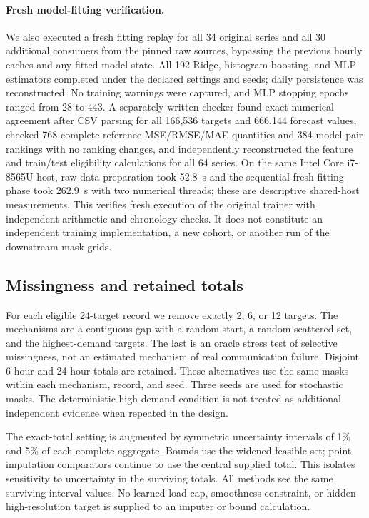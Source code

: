 \documentclass[12pt]{article}
\begin{document}
\paragraph{Fresh model-fitting verification.}
We also executed a fresh fitting replay for all 34 original series and all 30 additional consumers from the pinned raw sources, bypassing the previous hourly caches and any fitted model state. All 192 Ridge, histogram-boosting, and MLP estimators completed under the declared settings and seeds; daily persistence was reconstructed. No training warnings were captured, and MLP stopping epochs ranged from 28 to 443. A separately written checker found exact numerical agreement after CSV parsing for all 166,536 targets and 666,144 forecast values, checked 768 complete-reference MSE/RMSE/MAE quantities and 384 model-pair rankings with no ranking changes, and independently reconstructed the feature and train/test eligibility calculations for all 64 series. On the same Intel Core i7-8565U host, raw-data preparation took 52.8~s and the sequential fresh fitting phase took 262.9~s with two numerical threads; these are descriptive shared-host measurements. This verifies fresh execution of the original trainer with independent arithmetic and chronology checks. It does not constitute an independent training implementation, a new cohort, or another run of the downstream mask grids.

\subsection{Missingness and retained totals}
For each eligible 24-target record we remove exactly 2, 6, or 12 targets.
The mechanisms are a contiguous gap with a random start, a random scattered
set, and the highest-demand targets. The last is an oracle stress test of
selective missingness, not an estimated mechanism of real communication
failure. Disjoint 6-hour and 24-hour totals are retained. These alternatives
use the same masks within each mechanism, record, and seed. Three seeds
are used for stochastic masks. The deterministic high-demand condition is
not treated as additional independent evidence when repeated in the design.

The exact-total setting is augmented by symmetric uncertainty intervals of
1\% and 5\% of each complete aggregate. Bounds use the widened feasible
set; point-imputation comparators continue to use the central supplied
total. This isolates sensitivity to uncertainty in the surviving totals.
All methods see the same surviving interval values. No learned load cap,
smoothness constraint, or hidden high-resolution target is supplied to an
imputer or bound calculation.
\end{document}
